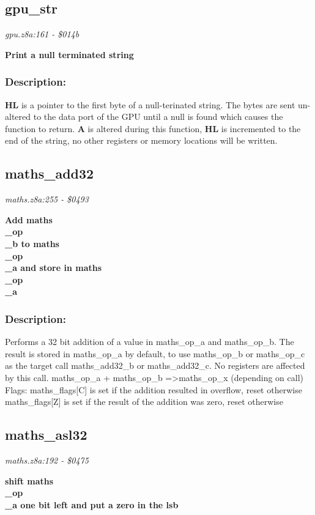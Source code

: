 \subsection{gpu\_str}
\textit{gpu.z8a:161 - \$014b}

\noindent
\textbf{Print a null terminated string}

\subsubsection{Description:}
 \textbf{HL} is a pointer to the first byte of a null-terinated string.  The bytes are sent un-altered to the data port of the GPU until a null is found which causes the function to return.  \textbf{A} is altered during this function, \textbf{HL} is incremented to the end of the string, no other registers or memory locations will be written.

\subsection{maths\_add32}
\textit{maths.z8a:255 - \$0493}

\noindent
\textbf{Add maths\\\_op\\\_b to maths\\\_op\\\_a and store in maths\\\_op\\\_a}

\subsubsection{Description:}
 Performs a 32 bit addition of a value in maths\_op\_a and maths\_op\_b.  The result is stored in maths\_op\_a by default, to use maths\_op\_b or maths\_op\_c as the target call maths\_add32\_b or maths\_add32\_c.  No registers are affected by this call. maths\_op\_a + maths\_op\_b =\textgreater  maths\_op\_x (depending on call) Flags:  maths\_flags[C] is set if the addition resulted in overflow, reset otherwise  maths\_flags[Z] is set if the result of the addition was zero, reset                 otherwise

\subsection{maths\_asl32}
\textit{maths.z8a:192 - \$0475}

\noindent
\textbf{shift maths\\\_op\\\_a one bit left and put a zero in the lsb}

